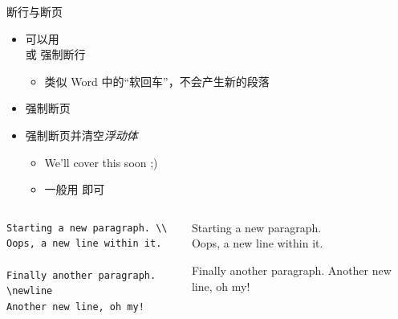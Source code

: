 \begin{frame}[fragile]{断行与断页}
\begin{itemize}
    \item 可以用 \texttt{\\} 或 \texttt{\newline} 强制断行
    \begin{itemize}
        \item 类似 Word 中的``软回车''，不会产生新的段落
    \end{itemize}
    \item \texttt{\newpage} 强制断页
    \item \texttt{\clearpage} 强制断页并清空\emph{浮动体}
    \begin{itemize}
        \item We'll cover this soon ;)
        \item 一般用 \texttt{\newpage} 即可
    \end{itemize}
\end{itemize}
\vspace{1em}
\pause

\begin{columns}
    \begin{column}{0.5\textwidth}
        \begin{verbatim}
Starting a new paragraph. \\
Oops, a new line within it.

Finally another paragraph. \newline
Another new line, oh my!
        \end{verbatim}
    \end{column}
    \begin{column}{0.45\textwidth}
        \setlength{\parskip}{.5em}\small
Starting a new paragraph. \\
Oops, a new line within it.

Finally another paragraph. \newline
Another new line, oh my!
    \end{column}
\end{columns}
\end{frame}
  
